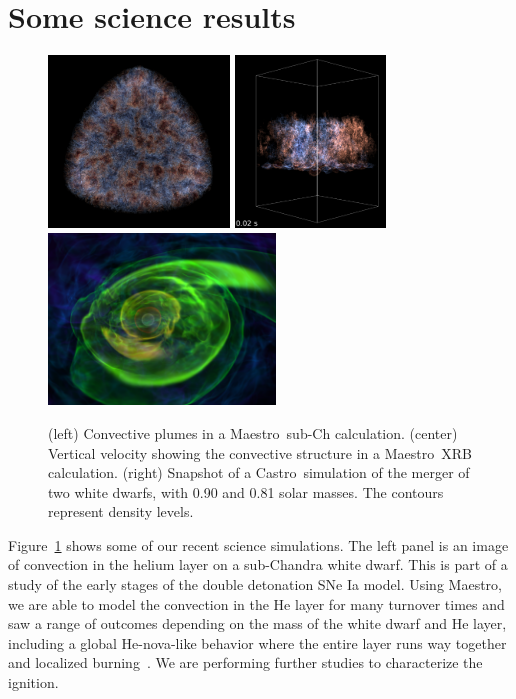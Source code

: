 \documentclass[a4paper]{jpconf}
\newcommand{\maestro}{{\sffamily Maestro}}
\newcommand{\castro}{{\sffamily Castro}}
\newcommand{\MarginPar}[1]{\marginpar{\vskip-\baselineskip\raggedright\tiny\sffamily\hrule\smallskip{\color{red}#1}\par\smallskip\hrule}}
\begin{document}
\section{Some science results}

\begin{figure}[t]
\centering \includegraphics[height=1.8in]{subch_h}
\includegraphics[height=1.8in]{xrb_compact}
\includegraphics[height=1.8in]{wdmerger_08030_new}
\caption{\label{fig:current-runs} (left) Convective plumes in a
  \maestro\ sub-Ch calculation. (center) Vertical velocity showing the
  convective structure in a \maestro\ XRB calculation. (right)
  Snapshot of a \castro\ simulation of the merger of two white dwarfs,
  with 0.90 and 0.81 solar masses. The contours represent density
  levels.}
\end{figure}

Figure~\ref{fig:current-runs} shows some of our recent science
simulations.  The left panel is an image of convection in the helium
layer on a sub-Chandra white dwarf.  This is part of a study of the
early stages of the double detonation SNe Ia model.  Using \maestro,
we are able to model the convection in the He layer for many turnover
times and saw a range of outcomes depending on the mass of the white
dwarf and He layer, including a global He-nova-like behavior where the
entire layer runs way together and localized
burning~\cite{subchandra2}.\MarginPar{incomplete sentence}
We are performing further studies to characterize the ignition.
\end{document}
